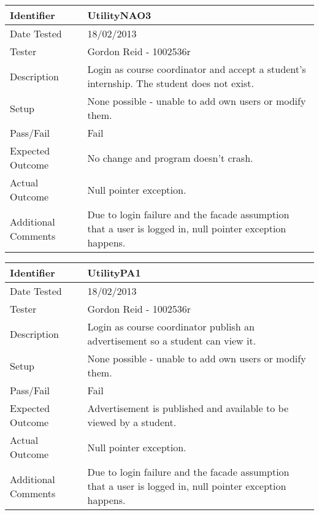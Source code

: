 \vspace{2em}

\begin{tabularx}{\textwidth}{|T|L|}
\hline
Identifier & UtilityNAO3\\
\hline
Date Tested & 18/02/2013\\
\hline
Tester & Gordon Reid - 1002536r\\
\hline
Description & Login as course coordinator and accept a student's internship.
The student does not exist.\\
\hline
Setup & None possible - unable to add own users or modify them.\\
\hline
Pass/Fail & Fail\\
\hline
Expected Outcome & No change and program doesn't crash.\\
\hline
Actual Outcome & Null pointer exception.\\
\hline
Additional Comments & Due to login failure and the facade assumption that a
user is logged in, null pointer exception happens.\\
\hline
\end{tabularx}

\begin{tabularx}{\textwidth}{|T|L|}
\hline
Identifier & UtilityPA1\\
\hline
Date Tested & 18/02/2013\\
\hline
Tester & Gordon Reid - 1002536r\\
\hline
Description & Login as course coordinator publish an advertisement so a 
student can view it.\\
\hline
Setup & None possible - unable to add own users or modify them.\\
\hline
Pass/Fail & Fail\\
\hline
Expected Outcome & Advertisement is published and available to be viewed by
a student.\\
\hline
Actual Outcome & Null pointer exception.\\
\hline
Additional Comments & Due to login failure and the facade assumption that a user 
is logged in, null pointer exception happens.\\
\hline
\end{tabularx}

\vspace{2em}

